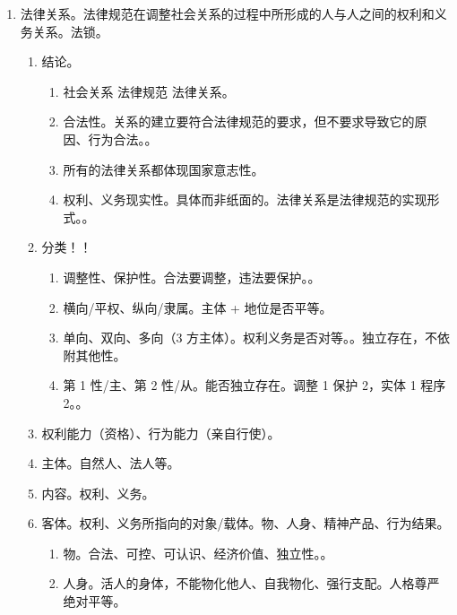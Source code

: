 \begin{enumerate}
\begin{enumerate}
\begin{enumerate}
                  \item 溯及力。对生效之前的未决案能否适用。从旧、从新、从新兼从旧、从旧兼从轻（最有利）。
                \end{enumerate}
        \end{enumerate}
  \item 法律关系。法律规范在调整社会关系的过程中所形成的人与人之间的权利和义务关系。法锁。
        \begin{enumerate}
          \item 结论。
                \begin{enumerate}
                  \item 社会关系 \yjt 法律规范 \yjt 法律关系。
                  \item 合法性。关系的建立要符合法律规范的要求，但不要求导致它的原因、行为合法。。
                  \item 所有的法律关系都体现国家意志性。
                  \item 权利、义务现实性。具体而非纸面的。法律关系是法律规范的实现形式。。
                \end{enumerate}
          \item 分类！！
                \begin{enumerate}
                  \item 调整性、保护性。合法要调整，违法要保护。。
                  \item 横向/平权、纵向/隶属。主体 + 地位是否平等。
                  \item 单向、双向、多向（3 方主体）。权利义务是否对等。。\sjt 独立存在，不依附其他性。
                  \item 第 1 性/主、第 2 性/从。能否独立存在。调整 1 保护 2，实体 1 程序 2。。
                \end{enumerate}
          \item 权利能力（资格）、行为能力（亲自行使）。
          \item 主体。自然人、法人等。
          \item 内容。权利、义务。
          \item 客体。权利、义务所指向的对象/载体。物、人身、精神产品、行为结果。
                \begin{enumerate}
                  \item 物。合法、可控、可认识、经济价值、独立性。。
                  \item 人身。活人的身体，不能物化他人、自我物化、强行支配。人格尊严绝对平等。

\end{enumerate}
\end{enumerate}
\end{enumerate}
